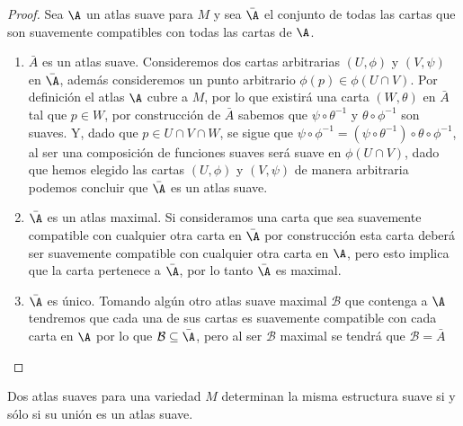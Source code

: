 \begin{proof}
	Sea $\A$ un atlas suave para $M$ y sea $\bar{\A}$ el conjunto de todas las cartas que son suavemente compatibles con todas las cartas de $\A$.
	\begin{enumerate}
		\item $\bar{A}$ es un atlas suave. Consideremos dos cartas arbitrarias $(U,\phi)$ y $(V,\psi)$ en $\bar{\A}$, además consideremos un punto arbitrario $\phi(p) \in \phi(U \cap V)$. Por definición el atlas $\A$ cubre a $M$, por lo que existirá una carta $(W,\theta)$ en $\bar{A}$ tal que $p \in W$, por construcción de $\bar{A}$ sabemos que $\psi \circ \theta^{-1}$ y $\theta \circ \phi^{-1}$ son suaves. Y, dado que $p \in U \cap V \cap W$, se sigue que $\psi \circ \phi^{-1} = (\psi \circ \theta^{-1}) \circ \theta \circ \phi^{-1}$, al ser una composición de funciones suaves será suave en $\phi(U \cap V)$, dado que hemos elegido las cartas $(U,\phi)$ y $(V,\psi)$ de manera arbitraria podemos concluir que $\bar{\A}$ es un atlas suave.
		\item $\bar{\A}$ es un atlas maximal. Si consideramos una carta que sea suavemente compatible con cualquier otra carta en $\bar{\A}$ por construcción esta carta deberá ser suavemente compatible con cualquier otra carta en $\A$, pero esto implica que la carta pertenece a $\bar{\A}$, por lo tanto $\bar{\A}$ es maximal.
		\item $\bar{\A}$ es único. Tomando algún otro atlas suave maximal $\mathcal{B}$ que contenga a $\A$ tendremos que cada una de sus cartas es suavemente compatible con cada carta en $\A$ por lo que $\mathcal{B} \subseteq \bar{\A}$, pero al ser $\mathcal{B}$ maximal se tendrá que $\mathcal{B} = \bar{A}$
	\end{enumerate}
\end{proof}

\begin{theorem}\label{Teorema: Unicidad de Estructura Suave}
	Dos atlas suaves para una variedad $M$ determinan la misma estructura suave si y sólo si su unión es un atlas suave.
\end{theorem}

